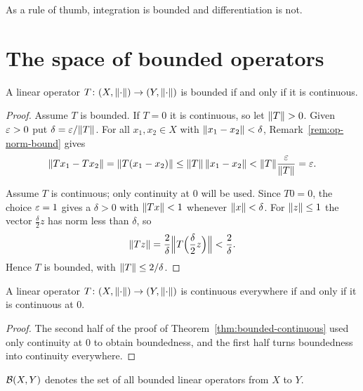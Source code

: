 \begin{remark}
As a rule of thumb, integration is bounded and differentiation is not.
\end{remark}

\section{The space of bounded operators}

\begin{theorem}\label{thm:bounded-continuous}
A linear operator $T \colon (X, \lVert\cdot\rVert) \to (Y, \lVert\cdot\rVert)$ is
bounded if and only if it is continuous.
\end{theorem}

\begin{proof}
Assume $T$ is bounded. If $T = 0$ it is continuous, so let $\lVert T\rVert > 0$.
Given $\varepsilon > 0$ put $\delta = \varepsilon / \lVert T\rVert$. For all $x_1, x_2 \in X$
with $\lVert x_1 - x_2\rVert < \delta$, Remark~\ref{rem:op-norm-bound} gives
\[
  \lVert T x_1 - T x_2\rVert = \lVert T(x_1 - x_2)\rVert
  \le \lVert T\rVert\,\lVert x_1 - x_2\rVert
  < \lVert T\rVert \frac{\varepsilon}{\lVert T\rVert} = \varepsilon .
\]

Assume $T$ is continuous; only continuity at $0$ will be used. Since
$T0 = 0$, the choice $\varepsilon = 1$ gives a $\delta > 0$ with $\lVert Tx\rVert < 1$
whenever $\lVert x\rVert < \delta$. For $\lVert z\rVert \le 1$ the vector
$\frac{\delta}{2} z$ has norm less than $\delta$, so
\[
  \lVert T z\rVert = \frac{2}{\delta} \Bigl\lVert T\Bigl(\frac{\delta}{2} z\Bigr)
  \Bigr\rVert < \frac{2}{\delta} .
\]
Hence $T$ is bounded, with $\lVert T\rVert \le 2/\delta$.
\end{proof}

\begin{corollary}\label{cor:cont-at-0}
A linear operator $T \colon (X, \lVert\cdot\rVert) \to (Y, \lVert\cdot\rVert)$ is
continuous everywhere if and only if it is continuous at $0$.
\end{corollary}

\begin{proof}
The second half of the proof of Theorem~\ref{thm:bounded-continuous} used
only continuity at $0$ to obtain boundedness, and the first half turns
boundedness into continuity everywhere.
\end{proof}

\begin{definition}\label{def:BXY}
$\mathcal{B}(X, Y)$ denotes the set of all bounded linear operators from $X$ to $Y$.
\end{definition}

